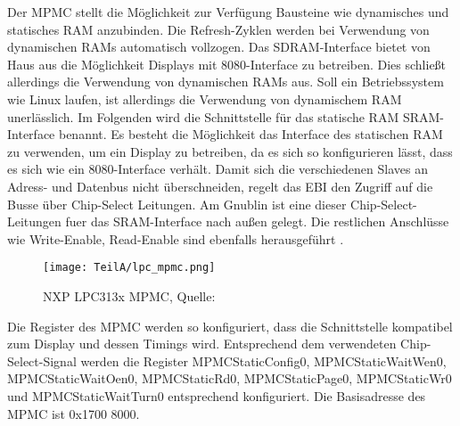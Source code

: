 Der MPMC stellt die Möglichkeit zur Verfügung Bausteine wie dynamisches und statisches RAM anzubinden. Die Refresh-Zyklen werden bei Verwendung von dynamischen RAMs automatisch vollzogen. Das SDRAM-Interface bietet von Haus aus die Möglichkeit Displays mit 8080-Interface zu betreiben. Dies schließt allerdings die Verwendung von dynamischen RAMs aus. Soll ein Betriebssystem wie Linux laufen, ist allerdings die Verwendung von dynamischem RAM unerlässlich. Im Folgenden wird die Schnittstelle für das statische RAM SRAM-Interface benannt. Es besteht die Möglichkeit das Interface des statischen RAM zu verwenden, um ein Display zu betreiben, da es sich so konfigurieren lässt, dass es sich wie ein 8080-Interface verhält. Damit sich die verschiedenen Slaves an Adress- und Datenbus nicht überschneiden, regelt das EBI den Zugriff auf die Busse über Chip-Select Leitungen. Am Gnublin ist eine dieser Chip-Select-Leitungen fuer das SRAM-Interface nach außen gelegt. Die restlichen Anschlüsse wie Write-Enable, Read-Enable sind ebenfalls herausgeführt \cite{NXP2010}.


\begin{figure}[tbph]
	\centering
	\texttt{[image: TeilA/lpc\_mpmc.png]}
	\caption{NXP LPC313x MPMC, Quelle: }
	\label{fig:lpc_mpmc}
\end{figure}
\newpage
Die Register des MPMC werden so konfiguriert, dass die Schnittstelle kompatibel zum Display und dessen Timings wird. Entsprechend dem verwendeten Chip-Select-Signal werden die Register MPMCStaticConfig0, MPMCStaticWaitWen0, MPMCStaticWaitOen0, MPMCStaticRd0, MPMCStaticPage0, MPMCStaticWr0 und MPMCStaticWaitTurn0 entsprechend  konfiguriert. Die Basisadresse des MPMC ist 0x1700 8000.

